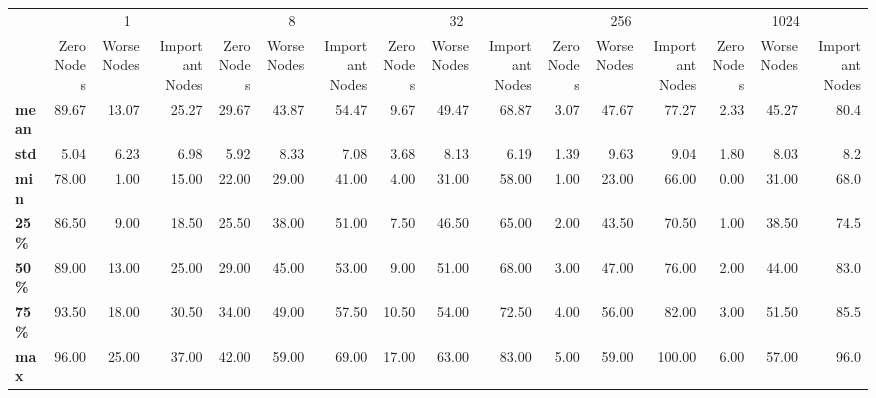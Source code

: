 \begin{tabular}{lrrrrrrrrrrrrrrr}
\toprule
{} & \multicolumn{3}{c}{1} & \multicolumn{3}{c}{8} & \multicolumn{3}{c}{32} & \multicolumn{3}{c}{256} & \multicolumn{3}{c}{1024} \\
{} & Zero Nodes & Worse Nodes & Important Nodes & Zero Nodes & Worse Nodes & Important Nodes & Zero Nodes & Worse Nodes & Important Nodes & Zero Nodes & Worse Nodes & Important Nodes & Zero Nodes & Worse Nodes & Important Nodes \\
\midrule
\textbf{mean} &      89.67 &       13.07 &           25.27 &      29.67 &       43.87 &           54.47 &       9.67 &       49.47 &           68.87 &       3.07 &       47.67 &           77.27 &       2.33 &       45.27 &            80.4 \\
\textbf{std } &       5.04 &        6.23 &            6.98 &       5.92 &        8.33 &            7.08 &       3.68 &        8.13 &            6.19 &       1.39 &        9.63 &            9.04 &       1.80 &        8.03 &             8.2 \\
\textbf{min } &      78.00 &        1.00 &           15.00 &      22.00 &       29.00 &           41.00 &       4.00 &       31.00 &           58.00 &       1.00 &       23.00 &           66.00 &       0.00 &       31.00 &            68.0 \\
\textbf{25\% } &      86.50 &        9.00 &           18.50 &      25.50 &       38.00 &           51.00 &       7.50 &       46.50 &           65.00 &       2.00 &       43.50 &           70.50 &       1.00 &       38.50 &            74.5 \\
\textbf{50\% } &      89.00 &       13.00 &           25.00 &      29.00 &       45.00 &           53.00 &       9.00 &       51.00 &           68.00 &       3.00 &       47.00 &           76.00 &       2.00 &       44.00 &            83.0 \\
\textbf{75\% } &      93.50 &       18.00 &           30.50 &      34.00 &       49.00 &           57.50 &      10.50 &       54.00 &           72.50 &       4.00 &       56.00 &           82.00 &       3.00 &       51.50 &            85.5 \\
\textbf{max } &      96.00 &       25.00 &           37.00 &      42.00 &       59.00 &           69.00 &      17.00 &       63.00 &           83.00 &       5.00 &       59.00 &          100.00 &       6.00 &       57.00 &            96.0 \\
\bottomrule
\end{tabular}
